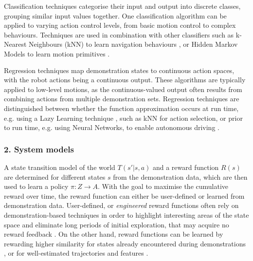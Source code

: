Classification techniques categorise their input and output into discrete classes, grouping similar input values together. One classification algorithm can be applied to varying action control levels, from basic motion control to complex behaviours. Techniques are used in combination with other classifiers such as k-Nearest Neighbours (kNN) to learn navigation behaviours \cite{saunders2006teaching}, or Hidden Markov Models \cite{hovland1996skill} to learn motion primitives \cite{rybski1999interactive}.

Regression techniques map demonstration states to continuous action spaces, with the robot actions being a continuous output. These algorithms are typically applied to low-level motions, as the continuous-valued output often results from combining actions from multiple demonstration sets. Regression techniques are distinguished between whether the function approximation occurs at run time, e.g. using a Lazy Learning technique \cite{atkeson1997locally}, such as kNN for action selection, or prior to run time, e.g. using Neural Networks, to enable autonomous driving \cite{pomerleau1991efficient}.

\subsubsection{2. System models}
A state transition model of the world $T(s'|s, a)$ and a reward function $R(s)$ are determined for different states $s$ from the demonstration data, which are then used to learn a policy $\pi : Z \rightarrow A$. With the goal to maximise the cumulative reward over time, the reward function can either be user-defined or learned from demonstration data.
User-defined, or \textit{engineered} reward functions often rely on demonstration-based techniques in order to highlight interesting areas of the state space and eliminate long periods of initial exploration, that may acquire no reward feedback \cite{smart2002effective}.
On the other hand, reward functions can be learned by rewarding higher similarity for states already encountered during demonstrations \cite{atkeson1997robot}, or for well-estimated trajectories and features \cite{abbeel2004apprenticeship}.
